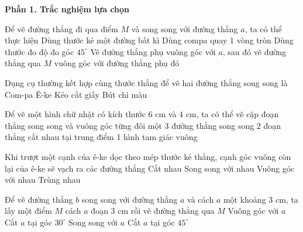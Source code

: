 \textbf{Phần 1. Trắc nghiệm lựa chọn}

\begin{ex} %
Để vẽ đường thẳng đi qua điểm $M$ và song song với đường thẳng $a$, ta có thể thực hiện
\choice
{Dùng thước kẻ một đường bất kì}
{Dùng compa quay 1 vòng tròn}
{Dùng thước đo độ đo góc $45^\circ$}
{\True Vẽ đường thẳng phụ vuông góc với $a$, sau đó vẽ đường thẳng qua $M$ vuông góc với đường thẳng phụ đó}
\end{ex}

\begin{ex} %
Dụng cụ thường kết hợp cùng thước thẳng để vẽ hai đường thẳng song song là
\choice
{Com-pa}
{\True Ê-ke}
{Kéo cắt giấy}
{Bút chì màu}
\end{ex}

\begin{ex} %
Để vẽ một hình chữ nhật có kích thước $6\text{ cm}$ và $4\text{ cm}$, ta có thể vẽ
\choice
{ cặp đoạn thẳng song song và vuông góc từng đôi một}
{3 đường thẳng song song}
{2 đoạn thẳng cắt nhau tại trung điểm}
{1 hình tam giác vuông}
\end{ex}

\begin{ex} %
Khi trượt một cạnh của ê-ke dọc theo mép thước kẻ thẳng, cạnh góc vuông còn lại của ê-ke sẽ vạch ra các đường thẳng
\choice
{Cắt nhau}
{\True Song song với nhau}
{Vuông góc với nhau}
{Trùng nhau}
\end{ex}

\begin{ex} %
Để vẽ đường thẳng $b$ song song với đường thẳng $a$ và cách $a$ một khoảng $3\text{ cm}$, ta lấy một điểm $M$ cách $a$ đoạn $3\text{ cm}$ rồi vẽ đường thẳng qua $M$
\choice
{Vuông góc với $a$}
{Cắt $a$ tại góc $30^\circ$}
{\True Song song với $a$}
{Cắt $a$ tại góc $45^\circ$}
\end{ex}

